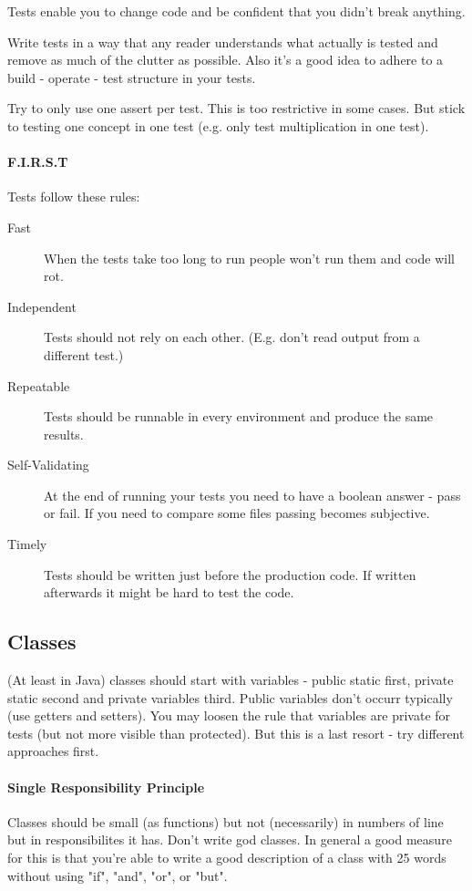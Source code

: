 \documentclass[a4paper, twocolumn]{article}
\begin{document}
Tests enable you to change code and be confident that you didn't break anything.

Write tests in a way that any reader understands what actually is tested and remove as much of the clutter as possible. Also it's a good idea to adhere to a build - operate - test structure in your tests.

Try to only use one assert per test. This is too restrictive in some cases. But stick to testing one concept in one test (e.g. only test multiplication in one test).

\paragraph{F.I.R.S.T}
Tests follow these rules:
\begin{description}
	\item[Fast] When the tests take too long to run people won't run them and code will rot.
	\item[Independent] Tests should not rely on each other. (E.g. don't read output from a different test.)
  	\item[Repeatable] Tests should be runnable in every environment and produce the same results.
	\item[Self-Validating] At the end of running your tests you need to have a boolean answer - pass or fail. If you need to compare some files passing becomes subjective.
	\item[Timely] Tests should be written just before the production code. If written afterwards it might be hard to test the code.
\end{description}

\subsection{Classes}
(At least in Java) classes should start with variables - public static first, private static second and private variables third. Public variables don't occurr typically (use getters and setters). You may loosen the rule that variables are private for tests (but not more visible than protected). But this is a last resort - try different approaches first.

\paragraph{Single Responsibility Principle} Classes should be small (as functions) but not (necessarily) in numbers of line but in responsibilites it has. Don't write god classes. In general a good measure for this is that you're able to write a good description of a class with 25 words without using "if", "and", "or", or "but".
\end{document}
